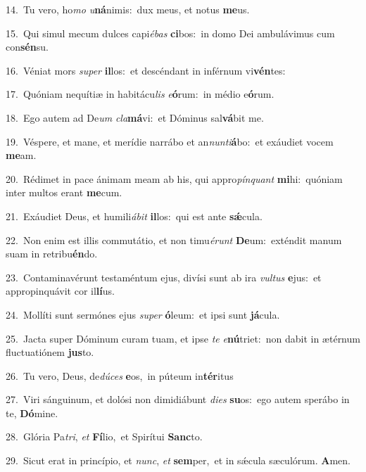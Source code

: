 {\numbfont\textcolor{\numbcolor}{14.}}~Tu vero, ho\textit{mo} \textit{u}\-\textbf{ná}nimis:~\star dux meus, et notus \textbf{me}\-us.\par
{\numbfont\textcolor{\numbcolor}{15.}}~Qui simul mecum dulces capi\-\textit{é}\-\textit{bas} \textbf{ci}\-bos:~\star in domo Dei ambulávimus cum con\-\textbf{sén}\-su.\par
{\numbfont\textcolor{\numbcolor}{16.}}~Véniat mors \textit{su}\-\textit{per} \textbf{il}\-los:~\star et descéndant in inférnum vi\-\textbf{vén}\-tes:\par
{\numbfont\textcolor{\numbcolor}{17.}}~Quóniam nequítiæ in habitácu\textit{lis} \textit{e}\-\textbf{ó}rum:~\star in médio e\-\textbf{ó}\-rum.\par
{\numbfont\textcolor{\numbcolor}{18.}}~Ego autem ad De\textit{um} \textit{cla}\-\textbf{má}vi:~\star et Dóminus sal\-\textbf{vá}\-bit me.\par
{\numbfont\textcolor{\numbcolor}{19.}}~Véspere, et mane, et merídie narrábo et an\-\textit{nun}\-\textit{ti}\textbf{á}bo:~\star et exáudiet vocem \textbf{me}\-am.\par
{\numbfont\textcolor{\numbcolor}{20.}}~Rédimet in pace ánimam meam ab his, qui appro\-\textit{pín}\-\textit{quant} \textbf{mi}\-hi:~\star quóniam inter multos erant \textbf{me}\-cum.\par
{\numbfont\textcolor{\numbcolor}{21.}}~Exáudiet Deus, et humili\-\textit{á}\-\textit{bit} \textbf{il}\-los:~\star qui est ante \textbf{sǽ}\-cula.\par
{\numbfont\textcolor{\numbcolor}{22.}}~Non enim est illis commutátio, et non timu\-\textit{é}\-\textit{runt} \textbf{De}\-um:~\star exténdit manum suam in retribu\-\textbf{én}\-do.\par
{\numbfont\textcolor{\numbcolor}{23.}}~Contaminavérunt testaméntum ejus, divísi sunt ab ira \textit{vul}\-\textit{tus} \textbf{e}\-jus:~\star et appropinquávit cor il\-\textbf{lí}\-us.\par
{\numbfont\textcolor{\numbcolor}{24.}}~Mollíti sunt sermónes ejus \textit{su}\-\textit{per} \textbf{ó}\-leum:~\star et ipsi sunt \textbf{já}\-cula.\par
{\numbfont\textcolor{\numbcolor}{25.}}~Jacta super Dóminum curam tuam, et ipse \textit{te} \textit{e}\-\textbf{nú}triet:~\star non dabit in ætérnum fluctuatiónem \textbf{jus}\-to.\par
{\numbfont\textcolor{\numbcolor}{26.}}~Tu vero, Deus, de\-\textit{dú}\-\textit{ces} \textbf{e}\-os,~\star in púteum in\-\textbf{tér}\-itus\par
{\numbfont\textcolor{\numbcolor}{27.}}~Viri sánguinum, et dolósi non dimidiábunt \textit{di}\-\textit{es} \textbf{su}\-os:~\star ego autem sperábo in te, \textbf{Dó}\-mine.\par
{\numbfont\textcolor{\numbcolor}{28.}}~Glória Pa\-\textit{tri}\-, \textit{et} \textbf{Fí}\-lio,~\star et Spirítui \textbf{Sanc}\-to.\par
{\numbfont\textcolor{\numbcolor}{29.}}~Sicut erat in princípio, et \textit{nunc}\-, \textit{et} \textbf{sem}\-per,~\star et in sǽcula sæculórum. \textbf{A}\-men.\par
